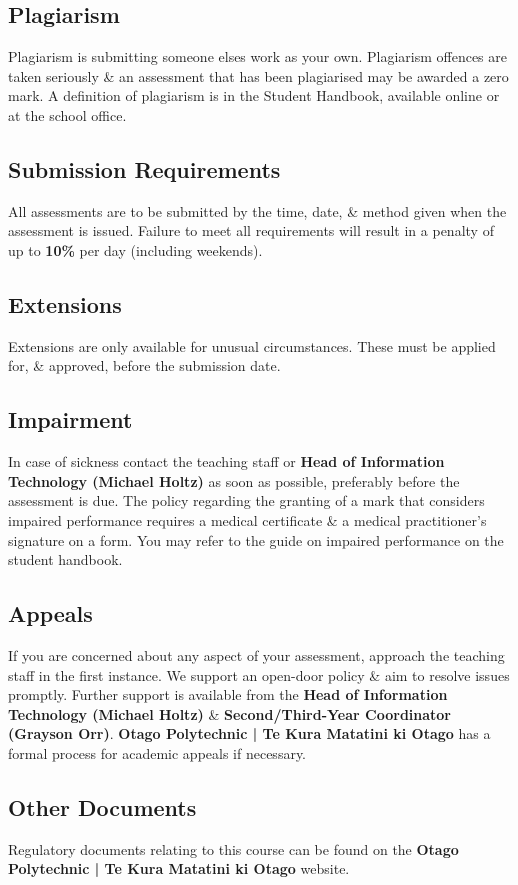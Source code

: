 \documentclass{article}
\begin{document}
\subsection*{Plagiarism}
Plagiarism is submitting someone elses work as your own. Plagiarism offences are taken seriously \& an assessment that has been plagiarised may be awarded a zero mark. A definition of plagiarism is in the Student Handbook, available online or at the school office.

\subsection*{Submission Requirements}
All assessments are to be submitted by the time, date, \& method given when the assessment is issued. Failure to meet all requirements will result in a penalty of up to \textbf{10\%} per day (including weekends).

\subsection*{Extensions}
Extensions are only available for unusual circumstances. These must be applied for, \& approved, before the submission date.

\subsection*{Impairment}
In case of sickness contact the teaching staff or \textbf{Head of Information Technology (Michael Holtz)} as soon as possible, preferably before the assessment is due. The policy regarding the granting of a mark that considers impaired performance requires a medical certificate \& a medical practitioner’s signature on a form. You may refer to the guide on impaired performance on the student handbook.

\subsection*{Appeals}
If you are concerned about any aspect of your assessment, approach the teaching staff in the first instance. We support an open-door policy \& aim to resolve issues promptly. Further support is available from the \textbf{Head of Information Technology (Michael Holtz)} \& \textbf{Second/Third-Year Coordinator (Grayson Orr)}. \textbf{Otago Polytechnic | Te Kura Matatini ki Otago} has a formal process for academic appeals if necessary.

\subsection*{Other Documents}
Regulatory documents relating to this course can be found on the \textbf{Otago Polytechnic | Te Kura Matatini ki Otago} website.
\end{document}

